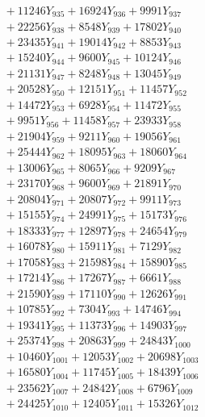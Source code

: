 \documentclass[a4paper,10pt]{article}
\begin{document}
{\begin{align}
&\;  + 11246 Y_{935} + 16924 Y_{936} + 9991 Y_{937} \\[0.3ex]
&\;  + 22256 Y_{938} + 8548 Y_{939} + 17802 Y_{940} \\[0.3ex]
&\;  + 23435 Y_{941} + 19014 Y_{942} + 8853 Y_{943} \\[0.3ex]
&\;  + 15240 Y_{944} + 9600 Y_{945} + 10124 Y_{946} \\[0.3ex]
&\;  + 21131 Y_{947} + 8248 Y_{948} + 13045 Y_{949} \\[0.3ex]
&\;  + 20528 Y_{950} + 12151 Y_{951} + 11457 Y_{952} \\[0.3ex]
&\;  + 14472 Y_{953} + 6928 Y_{954} + 11472 Y_{955} \\[0.3ex]
&\;  + 9951 Y_{956} + 11458 Y_{957} + 23933 Y_{958} \\[0.5ex]\allowbreak
&\;  + 21904 Y_{959} + 9211 Y_{960} + 19056 Y_{961} \\[0.3ex]
&\;  + 25444 Y_{962} + 18095 Y_{963} + 18060 Y_{964} \\[0.3ex]
&\;  + 13006 Y_{965} + 8065 Y_{966} + 9209 Y_{967} \\[0.3ex]
&\;  + 23170 Y_{968} + 9600 Y_{969} + 21891 Y_{970} \\[0.3ex]
&\;  + 20804 Y_{971} + 20807 Y_{972} + 9911 Y_{973} \\[0.3ex]
&\;  + 15155 Y_{974} + 24991 Y_{975} + 15173 Y_{976} \\[0.3ex]
&\;  + 18333 Y_{977} + 12897 Y_{978} + 24654 Y_{979} \\[0.3ex]
&\;  + 16078 Y_{980} + 15911 Y_{981} + 7129 Y_{982} \\[0.3ex]
&\;  + 17058 Y_{983} + 21598 Y_{984} + 15890 Y_{985} \\[0.3ex]
&\;  + 17214 Y_{986} + 17267 Y_{987} + 6661 Y_{988} \\[0.5ex]\allowbreak
&\;  + 21590 Y_{989} + 17110 Y_{990} + 12626 Y_{991} \\[0.3ex]
&\;  + 10785 Y_{992} + 7304 Y_{993} + 14746 Y_{994} \\[0.3ex]
&\;  + 19341 Y_{995} + 11373 Y_{996} + 14903 Y_{997} \\[0.3ex]
&\;  + 25374 Y_{998} + 20863 Y_{999} + 24843 Y_{1000} \\[0.3ex]
&\;  + 10460 Y_{1001} + 12053 Y_{1002} + 20698 Y_{1003} \\[0.3ex]
&\;  + 16580 Y_{1004} + 11745 Y_{1005} + 18439 Y_{1006} \\[0.3ex]
&\;  + 23562 Y_{1007} + 24842 Y_{1008} + 6796 Y_{1009} \\[0.3ex]
&\;  + 24425 Y_{1010} + 12405 Y_{1011} + 15326 Y_{1012} \\[0.3ex]

\end{align}}
\end{document}
